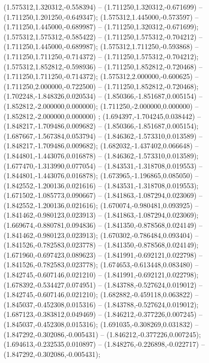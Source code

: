  (1.575312,1.320312,-0.558394) -- (1.711250,1.320312,-0.671699) -- (1.711250,1.201250,-0.649347);
 (1.575312,1.445000,-0.573597) -- (1.711250,1.445000,-0.689987) -- (1.711250,1.320312,-0.671699);
 (1.575312,1.575312,-0.585422) -- (1.711250,1.575312,-0.704212) -- (1.711250,1.445000,-0.689987);
 (1.575312,1.711250,-0.593868) -- (1.711250,1.711250,-0.714372) -- (1.711250,1.575312,-0.704212);
 (1.575312,1.852812,-0.598936) -- (1.711250,1.852812,-0.720468) -- (1.711250,1.711250,-0.714372);
 (1.575312,2.000000,-0.600625) -- (1.711250,2.000000,-0.722500) -- (1.711250,1.852812,-0.720468);
 (1.702248,-1.848326,0.020534) -- (1.850366,-1.851687,0.005154) -- (1.852812,-2.000000,0.000000);
 (1.711250,-2.000000,0.000000) -- (1.852812,-2.000000,0.000000) ;
 (1.694397,-1.704245,0.038442) -- (1.848217,-1.709486,0.009682) -- (1.850366,-1.851687,0.005154);
 (1.687667,-1.567384,0.053794) -- (1.846362,-1.573310,0.013589) -- (1.848217,-1.709486,0.009682);
 (1.682032,-1.437402,0.066648) -- (1.844801,-1.443076,0.016878) -- (1.846362,-1.573310,0.013589);
 (1.677470,-1.313990,0.077054) -- (1.843531,-1.318708,0.019553) -- (1.844801,-1.443076,0.016878);
 (1.673965,-1.196865,0.085050) -- (1.842552,-1.200136,0.021616) -- (1.843531,-1.318708,0.019553);
 (1.671502,-1.085773,0.090667) -- (1.841863,-1.087294,0.023069) -- (1.842552,-1.200136,0.021616);
 (1.670074,-0.980481,0.093925) -- (1.841462,-0.980123,0.023913) -- (1.841863,-1.087294,0.023069);
 (1.669674,-0.880781,0.094836) -- (1.841350,-0.878568,0.024149) -- (1.841462,-0.980123,0.023913);
 (1.670302,-0.786484,0.093404) -- (1.841526,-0.782583,0.023778) -- (1.841350,-0.878568,0.024149);
 (1.671960,-0.697423,0.089623) -- (1.841991,-0.692121,0.022798) -- (1.841526,-0.782583,0.023778);
 (1.674653,-0.613448,0.083480) -- (1.842745,-0.607146,0.021210) -- (1.841991,-0.692121,0.022798);
 (1.678392,-0.534427,0.074951) -- (1.843788,-0.527624,0.019012) -- (1.842745,-0.607146,0.021210);
 (1.682882,-0.459118,0.063822) -- (1.845037,-0.452308,0.015316) -- (1.843788,-0.527624,0.019012);
 (1.687123,-0.383812,0.049469) -- (1.846212,-0.377226,0.007245) -- (1.845037,-0.452308,0.015316);
 (1.691035,-0.308269,0.031832) -- (1.847292,-0.302086,-0.005431) -- (1.846212,-0.377226,0.007245);
 (1.694613,-0.232535,0.010897) -- (1.848276,-0.226898,-0.022717) -- (1.847292,-0.302086,-0.005431);
